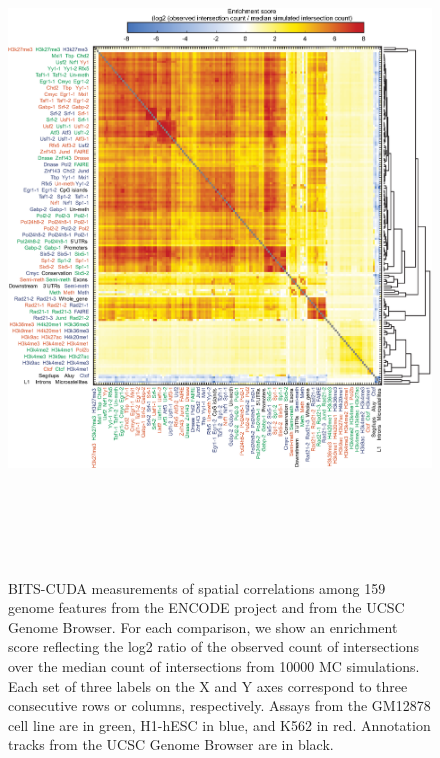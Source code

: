\documentclass{bioinfo}
\begin{document}
\begin{figure}[btp]
        \includegraphics[width=7in,height=7in]{heatmap_matrix_nolabels_10000iterations.eps}
        \caption[]{BITS-CUDA measurements of spatial correlations
among 159 genome features from the ENCODE project and from the UCSC
Genome Browser. For each comparison, we show an enrichment score
reflecting the log2 ratio of the observed count of intersections over
the median count of intersections from 10000 MC simulations. Each set of three
labels on the X and Y axes correspond to three consecutive rows or columns,
respectively. Assays from the GM12878 cell line are in green, H1-hESC in blue,
and K562 in red.  Annotation tracks from the UCSC Genome Browser are in black.}
\end{figure}



\vspace{-2em}
\end{document}
